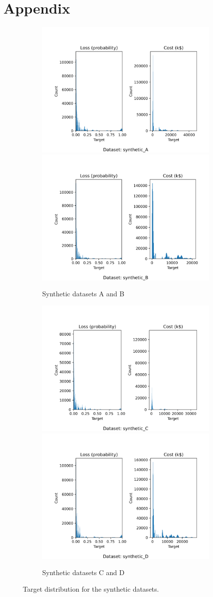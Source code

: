 \chapter{Appendix}\label{appendix:A}

\begin{figure}[h!]
  \begin{subfigure}{\linewidth}
  \includegraphics[width=.5\linewidth]{images/synthetic/synthetic_A_histogram.png}\hfill
  \includegraphics[width=.5\linewidth]{images/synthetic/synthetic_B_histogram.png}
  \caption{Synthetic datasets A and B}
  \end{subfigure}\par\medskip
  \begin{subfigure}{\linewidth}
  \includegraphics[width=.5\linewidth]{images/synthetic/synthetic_C_histogram.png}\hfill
  \includegraphics[width=.5\linewidth]{images/synthetic/synthetic_D_histogram.png}
  \caption{Synthetic datasets C and D}
  \end{subfigure}
  \caption{\label{fig:distribution-hard}Target distribution for the synthetic datasets.}
\end{figure}

